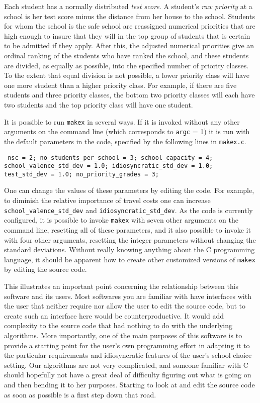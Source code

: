 \documentclass[12pt]{article}
\theoremstyle{definition}
\begin{document}
Each student has a normally distributed \emph{test score}.  A
student's \emph{raw priority} at a school is her test score minus the
distance from her house to the school.  Students for whom the school
is the safe school are reassigned numerical priorities that are high
enough to insure that they will in the top group of students that is
certain to be admitted if they apply.  After this, the adjusted
numerical priorities give an ordinal ranking of the students who have
ranked the school, and these students are divided, as equally as
possible, into the specified number of priority classes.  To the
extent that equal division is not possible, a lower priority class
will have one more student than a higher priority class.  For example,
if there are five students and three priority classes, the bottom two
priority classes will each have two students and the top priority
class will have one student.

It is possible to run \texttt{makex} in several ways.  If it is
invoked without any other arguments on the command line (which
corresponds to \texttt{argc} = 1) it is run with the default
parameters in the code, specified by the following lines in
\texttt{makex.c}.
\begin{obeylines}\texttt{
  nsc = 2;
  no\_students\_per\_school = 3;
  school\_capacity = 4;
  school\_valence\_std\_dev = 1.0;
  idiosyncratic\_std\_dev = 1.0;
  test\_std\_dev = 1.0;
  no\_priority\_grades = 3;
}
\end{obeylines} \noindent
One can change the values of these parameters by editing the code.
For example, to diminish the relative importance of travel costs one
can increase \texttt{school\_valence\_std\_dev} and
\texttt{idiosyncratic\_std\_dev}.  As the code is currently
configured, it is possible to invoke \texttt{makex} with seven other
arguments on the command line, resetting all of these parameters, and
it also possible to invoke it with four other arguments, resetting the
integer parameters without changing the standard deviations.  Without
really knowing anything about the C programming language, it should be
apparent how to create other customized versions of \texttt{makex} by
editing the source code.

This illustrates an important point concerning the relationship
between this software and its users.  Most softwares you are familiar
with have interfaces with the user that neither require nor allow the
user to edit the source code, but to create such an interface here
would be counterproductive. It would add complexity to the source code
that had nothing to do with the underlying algorithms.  More
importantly, one of the main purposes of this software is to provide a
starting point for the user's own programming effort in adapting it to
the particular requirements and idiosyncratic features of the user's
school choice setting.  Our algorithms are not very complicated, and
someone familiar with C should hopefully not have a great deal of
difficulty figuring out what is going on and then bending it to her
purposes.  Starting to look at and edit the source code as soon as
possible is a first step down that road.
\end{document}
